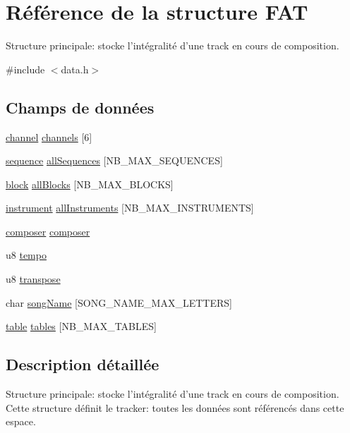 \hypertarget{struct_f_a_t}{
\section{Référence de la structure FAT}
\label{struct_f_a_t}
}


Structure principale: stocke l'intégralité d'une track en cours de composition.  




{\ttfamily \#include $<$data.h$>$}

\subsection*{Champs de données}
\begin{DoxyCompactItemize}
\item 
\hyperlink{struct_c_h_a_n_n_e_l}{channel} \hyperlink{struct_f_a_t_a87102826e08bc9bdb2ca1bf0b53f8ac9}{channels} \mbox{[}6\mbox{]}
\item 
\hyperlink{struct_s_e_q_u_e_n_c_e}{sequence} \hyperlink{struct_f_a_t_aedb7f8fa6f53bd2273c70a9febd76aaa}{allSequences} \mbox{[}NB\_\-MAX\_\-SEQUENCES\mbox{]}
\item 
\hyperlink{struct_b_l_o_c_k}{block} \hyperlink{struct_f_a_t_ac7fd37a6fdc98d68f68a4ca0082a31a0}{allBlocks} \mbox{[}NB\_\-MAX\_\-BLOCKS\mbox{]}
\item 
\hyperlink{struct_i_n_s_t_r_u_m_e_n_t}{instrument} \hyperlink{struct_f_a_t_af95be502ce562f33d068959c2d3a6c14}{allInstruments} \mbox{[}NB\_\-MAX\_\-INSTRUMENTS\mbox{]}
\item 
\hyperlink{struct_c_o_m_p_o_s_e_r}{composer} \hyperlink{struct_f_a_t_a5295928ddfd03f71d0fe60e2877b253a}{composer}
\item 
u8 \hyperlink{struct_f_a_t_a818a64490682a41a13e442b417bcb459}{tempo}
\item 
u8 \hyperlink{struct_f_a_t_a841401a367ef1cd53370b5c66363bdc9}{transpose}
\item 
char \hyperlink{struct_f_a_t_a21b7fa961fccb52ae1decc3ab2fe9bd5}{songName} \mbox{[}SONG\_\-NAME\_\-MAX\_\-LETTERS\mbox{]}
\item 
\hyperlink{struct_t_a_b_l_e}{table} \hyperlink{struct_f_a_t_ae51db5320b24fb28d769019f35c2051f}{tables} \mbox{[}NB\_\-MAX\_\-TABLES\mbox{]}
\end{DoxyCompactItemize}


\subsection{Description détaillée}
Structure principale: stocke l'intégralité d'une track en cours de composition. Cette structure définit le tracker: toutes les données sont référencés dans cette espace. 

